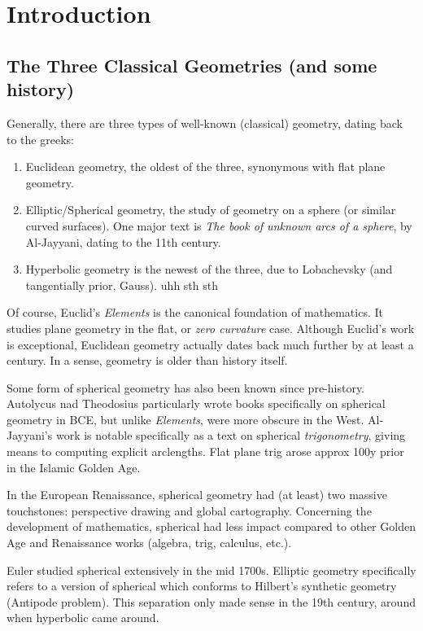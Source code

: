 \documentclass{article}
\begin{document}
\cover
\toc
\blurb


\section{Introduction}
\subsection{The Three Classical Geometries (and some history)}

Generally, there are three types of well-known (classical) geometry, dating back to the greeks:
\begin{enumerate}
    \item Euclidean geometry, the oldest of the three, synonymous with flat plane geometry.
    \item Elliptic/Spherical geometry, the study of geometry on a sphere (or similar curved
        surfaces). One major text is \textit{The book of unknown arcs of a sphere}, by Al-Jayyani,
        dating to the 11th century.
    \item Hyperbolic geometry is the newest of the three, due to Lobachevsky (and tangentially
        prior, Gauss). uhh sth sth
\end{enumerate}
Of course, Euclid's \textit{Elements} is the canonical foundation of mathematics. It studies
plane geometry in the flat, or \textit{zero curvature} case. Although Euclid's work is exceptional,
Euclidean geometry actually dates back much further by at
least a century. In a sense, geometry is older than history itself.

Some form of spherical geometry has also been known since pre-history.
Autolycus nad Theodosius particularly wrote books specifically on spherical geometry in BCE,
but unlike \textit{Elements}, were more obscure in the West.
Al-Jayyani's work is notable specifically as a text on spherical \textit{trigonometry}, giving
means to computing explicit arclengths. Flat plane trig arose approx 100y prior in the Islamic
Golden Age.

In the European Renaissance, spherical geometry had (at least) two massive touchstones: perspective
drawing and global cartography. Concerning the development of mathematics, spherical had less
impact compared to other Golden Age and Renaissance works (algebra, trig, calculus, etc.).

Euler studied spherical extensively in the mid 1700s. Elliptic geometry specifically refers to a
version of spherical which conforms to Hilbert's synthetic geometry (Antipode problem). This
separation only made sense in the 19th century, around when hyperbolic came around.
\end{document}
